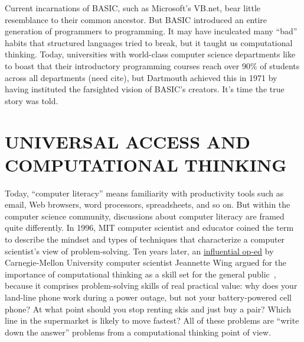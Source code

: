 \documentclass{article}
\begin{document}
Current incarnations of BASIC, such as Microsoft's VB.net, bear little resemblance to
their common ancestor.  But BASIC introduced an entire generation of
programmers to programming.  It may have inculcated many ``bad'' habits that
structured languages tried to break, but it taught us computational
thinking.  Today, universities with world-class computer science
departments like to boast that their introductory programming courses
reach over 90\% of
students across all departments (need cite), but
Dartmouth achieved this in 1971 by having instituted the farsighted
vision of BASIC's creators.  It's time the true story was told.


\section{UNIVERSAL ACCESS AND COMPUTATIONAL THINKING}



Today, ``computer
literacy'' means familiarity with 
productivity tools such as email, Web browsers, word processors,
spreadsheets, and so on.  
But within the computer science community, discussions about computer
literacy are framed quite differently.  
In 1996, MIT computer scientist and educator
 coined the term  to
describe the mindset and types of techniques that
characterize a computer scientist's view of problem-solving.
Ten years later, an
\href{http://www.cs.cmu.edu/afs/cs/usr/wing/www/publications/Wing06.pdf}{influential op-ed} by Carnegie-Mellon University computer scientist
Jeannette Wing argued for the importance of computational thinking as a
skill set for the general 
public~\cite{wing_computational_thinking}, because it comprises
problem-solving skills of real practical value: why does your land-line
phone work during a power outage, but not your battery-powered cell phone?  At
what point should you stop renting skis and just buy a pair?  Which line
in the supermarket is likely to move fastest?  All of these problems are
``write down the answer'' problems from a computational thinking point
of view.
\end{document}
